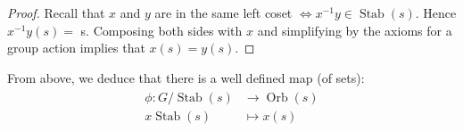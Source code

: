 \documentclass{article}
\newcommand{\Stab}{\operatorname{Stab}}
\begin{document}
\begin{proof}
Recall that $x$ and $y$ are in the same left coset $\Longleftrightarrow x^{-1} y \in \Stab(s)$. Hence $x^{-1} y(s)=$
s. Composing both sides with $x$ and simplifying by the axioms for a group action implies that $x(s)=y(s)$.
\end{proof} 
\begin{defa}
From above, we deduce that there is a well defined map (of sets):
\begin{align*}
\begin{aligned}
\phi: G / \Stab(s) & \rightarrow \operatorname{Orb}(s) \\
x \Stab(s) & \mapsto x(s)
\end{aligned}
\end{align*}
\end{defa}
\end{document}
